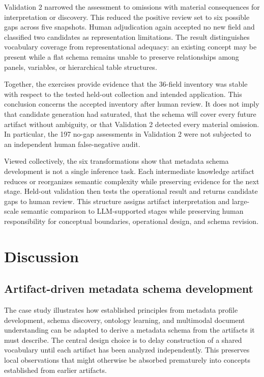 \documentclass{article}
\begin{document}
Validation 2 narrowed the assessment to omissions with material consequences for interpretation or discovery. This reduced the positive review set to six possible gaps across five snapshots. Human adjudication again accepted no new field and classified two candidates as representation limitations. The result distinguishes vocabulary coverage from representational adequacy: an existing concept may be present while a flat schema remains unable to preserve relationships among panels, variables, or hierarchical table structures.

Together, the exercises provide evidence that the 36-field inventory was stable with respect to the tested held-out collection and intended application. This conclusion concerns the accepted inventory after human review. It does not imply that candidate generation had saturated, that the schema will cover every future artifact without ambiguity, or that Validation 2 detected every material omission. In particular, the 197 no-gap assessments in Validation 2 were not subjected to an independent human false-negative audit.

Viewed collectively, the six transformations show that metadata schema development is not a single inference task. Each intermediate knowledge artifact reduces or reorganizes semantic complexity while preserving evidence for the next stage. Held-out validation then tests the operational result and returns candidate gaps to human review. This structure assigns artifact interpretation and large-scale semantic comparison to LLM-supported stages while preserving human responsibility for conceptual boundaries, operational design, and schema revision.

\section{Discussion}

\subsection{Artifact-driven metadata schema development}

The case study illustrates how established principles from metadata profile development, schema discovery, ontology learning, and multimodal document understanding can be adapted to derive a metadata schema from the artifacts it must describe. The central design choice is to delay construction of a shared vocabulary until each artifact has been analyzed independently. This preserves local observations that might otherwise be absorbed prematurely into concepts established from earlier artifacts.
\end{document}
